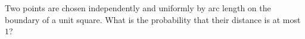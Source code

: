 Two points are chosen independently and uniformly by arc length on the boundary of a unit square. What is the probability that their distance is at most $1$?
